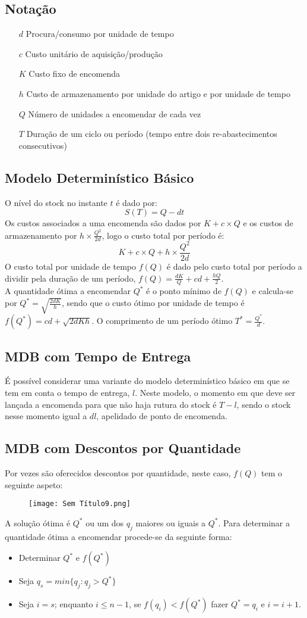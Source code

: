 \documentclass[10pt,a4paper]{report}
\begin{document}
\subsection{Notação}
\begin{itemize}
\item[$d$] Procura/consumo por unidade de tempo
\item[$c$] Custo unitário de aquisição/produção
\item[$K$] Custo fixo de encomenda
\item[$h$] Custo de armazenamento por unidade do artigo e por unidade de tempo
\item[$Q$] Número de unidades a encomendar de cada vez
\item[$T$] Duração de um ciclo ou período (tempo entre dois re-abastecimentos consecutivos)
\end{itemize}
\subsection{Modelo Determinístico Básico}
O nível do stock no instante $t$ é dado por:
$$
S(T) = Q - dt
$$
Os custos associados a uma encomenda são dados por $K + c \times Q$ e os custos de armazenamento por $h \times \frac{Q^2}{2d}$, logo o custo total por período é:
$$
K + c \times Q + h \times \frac{Q^2}{2d}
$$
O custo total por unidade de tempo $f(Q)$ é dado pelo custo total por período a dividir pela duração de um período, $f(Q) = \frac{dK}{Q} + cd + \frac{hQ}{2}$.\\
A quantidade ótima a encomendar $Q^*$ é o ponto mínimo de $f(Q)$ e calcula-se por $Q^* = \sqrt{\frac{2dK}{h}}$, sendo que o custo ótimo por unidade de tempo é $f(Q^*) = cd + \sqrt{2dKh}$. O comprimento de um período ótimo $T^* = \frac{Q^*}{d}$.
\subsection{MDB com Tempo de Entrega}
É possível considerar uma variante do modelo determinístico básico em que se tem em conta o tempo de entrega, $l$. Neste modelo, o momento em que deve ser lançada a encomenda para que não haja rutura do stock é $T - l$, sendo o stock nesse momento igual a $dl$, apelidado de ponto de encomenda.
\subsection{MDB com Descontos por Quantidade}
Por vezes são oferecidos descontos por quantidade, neste caso, $f(Q)$ tem o seguinte aspeto:
\begin{figure}[H]
\centering
\texttt{[image: Sem Título9.png]}
\end{figure}
A solução ótima é $Q^*$ ou um dos $q_j$ maiores ou iguais a $Q^*$. Para determinar a quantidade ótima a encomendar procede-se da seguinte forma:
\begin{itemize}
\item Determinar $Q^*$ e $f(Q^*)$
\item Seja $q_s = min \{q_j : q_j > Q^*\}$
\item Seja $i = s$; enquanto $i \leq n-1$, se $f(q_i) < f(Q^*)$ fazer $Q^* = q_i$ e $i = i + 1$.
\end{itemize}
\end{document}
